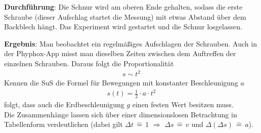 \documentclass[../main.tex]{subfiles}
\begin{document}
\begin{tcolorbox}
    \vspace{-0.7cm}
    \begin{minipage}[]{0.7\textwidth}
        \textbf{Durchführung}:   Die Schnur wird am oberen Ende gehalten, sodass die erste Schraube (dieser Aufschlag startet die Messung) mit etwas Abstand über dem Backblech hängt. Das Experiment wird gestartet und die Schnur losgelassen.

        \vspace{0.5cm}
        \textbf{Ergebnis}: Man beobachtet ein regelmäßiges Aufschlagen der Schrauben. Auch in der Phyphox-App misst man dieselben Zeiten zwischen dem Auftreffen der einzelnen Schrauben. Daraus folgt die Proportionalität
        \begin{align*}
            s \sim t^2
        \end{align*}
        Kennen die SuS die Formel für Bewegungen mit konstanter Beschleunigung $a$
        \begin{align*}
            s(t) = \frac{1}{2} \cdot a \cdot  t^2
        \end{align*}
        folgt, dass auch die Erdbeschleunigung $g$ einen festen Wert besitzen muss.\\
        Die Zusammenhänge lassen sich über einer dimensionslosen Betrachtung in Tabellenform verdeutlichen (dabei gilt $\Delta t \, \widehat{=} \, 1$ $\Rightarrow$ $\Delta s \,\widehat{=}\, v$ und $\Delta(\Delta s)\,\widehat{=}\,a$).
    \end{minipage}
    \hspace{0.2cm}
    \begin{minipage}[]{0.2\textwidth}
        \vspace{1.0cm} 

\end{minipage}
\end{tcolorbox}
\end{document}
